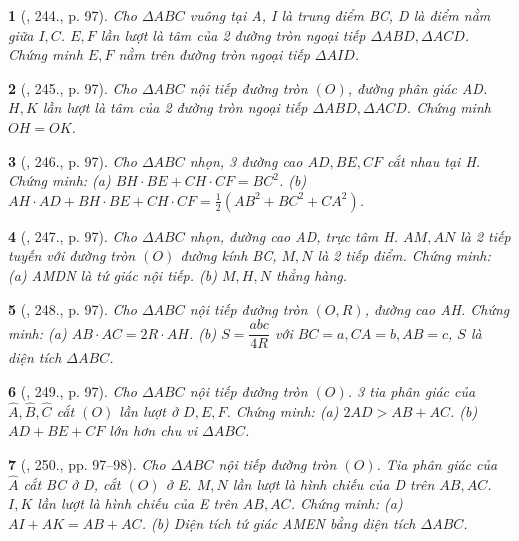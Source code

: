 \documentclass{article}
\newtheorem{baitoan}{}
\begin{document}
\begin{baitoan}[\cite{Binh_Toan_9_tap_2}, 244., p. 97]
	Cho $\Delta ABC$ vuông tại A, I là trung điểm BC, D là điểm nằm giữa $I,C$. $E,F$ lần lượt là tâm của 2 đường tròn ngoại tiếp $\Delta ABD,\Delta ACD$. Chứng minh $E,F$ nằm trên đường tròn ngoại tiếp $\Delta AID$.
\end{baitoan}

\begin{baitoan}[\cite{Binh_Toan_9_tap_2}, 245., p. 97]
	Cho $\Delta ABC$ nội tiếp đường tròn $(O)$, đường phân giác AD. $H,K$ lần lượt là tâm của 2 đường tròn ngoại tiếp $\Delta ABD,\Delta ACD$. Chứng minh $OH = OK$.
\end{baitoan}

\begin{baitoan}[\cite{Binh_Toan_9_tap_2}, 246., p. 97]
	Cho $\Delta ABC$ nhọn, 3 đường cao $AD,BE,CF$ cắt nhau tại H. Chứng minh: (a) $BH\cdot BE + CH\cdot CF = BC^2$. (b) $AH\cdot AD + BH\cdot BE + CH\cdot CF = \frac{1}{2}(AB^2 + BC^2 + CA^2)$.
\end{baitoan}

\begin{baitoan}[\cite{Binh_Toan_9_tap_2}, 247., p. 97]
	Cho $\Delta ABC$ nhọn, đường cao AD, trực tâm H. $AM,AN$ là 2 tiếp tuyến với đường tròn $(O)$ đường kính BC, $M,N$ là 2 tiếp điểm. Chứng minh: (a) AMDN là tứ giác nội tiếp. (b) $M,H,N$ thẳng hàng.
\end{baitoan}

\begin{baitoan}[\cite{Binh_Toan_9_tap_2}, 248., p. 97]
	Cho $\Delta ABC$ nội tiếp đường tròn $(O,R)$, đường cao AH. Chứng minh: (a) $AB\cdot AC = 2R\cdot AH$. (b) $S = \dfrac{abc}{4R}$ với $BC = a,CA = b,AB = c$, $S$ là diện tích $\Delta ABC$.
\end{baitoan}

\begin{baitoan}[\cite{Binh_Toan_9_tap_2}, 249., p. 97]
	Cho $\Delta ABC$ nội tiếp đường tròn $(O)$. 3 tia phân giác của $\widehat{A},\widehat{B},\widehat{C}$ cắt $(O)$ lần lượt ở $D,E,F$. Chứng minh: (a) $2AD > AB + AC$. (b) $AD + BE + CF$ lớn hơn chu vi $\Delta ABC$.
\end{baitoan}

\begin{baitoan}[\cite{Binh_Toan_9_tap_2}, 250., pp. 97--98]
	Cho $\Delta ABC$ nội tiếp đường tròn $(O)$. Tia phân giác của $\widehat{A}$ cắt BC ở D, cắt $(O)$ ở E. $M,N$ lần lượt là hình chiếu của D trên $AB,AC$. $I,K$ lần lượt là hình chiếu của E trên $AB,AC$. Chứng minh: (a) $AI + AK = AB + AC$. (b) Diện tích tứ giác AMEN bằng diện tích $\Delta ABC$.
\end{baitoan}
\end{document}
